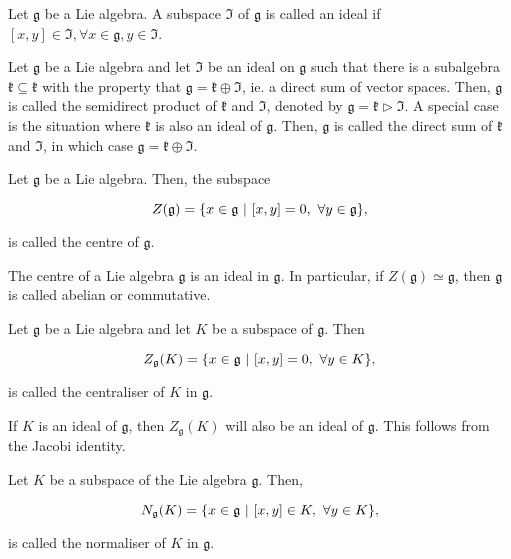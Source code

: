 \documentclass{homework}
\begin{document}
\begin{df}
Let $\mathfrak{g}$ be a Lie algebra. A subspace $\mathfrak{I}$ of $\mathfrak{g}$ is called an ideal if $[x,y] \in \mathfrak{I}, \forall x \in \mathfrak{g}, y \in \mathfrak{I}$. 
\end{df}

Let $\mathfrak{g}$ be a Lie algebra and let $\mathfrak{I}$ be an ideal on $\mathfrak{g}$ such that there is a subalgebra $\mathfrak{k} \subseteq \mathfrak{k}$ with the property that $\mathfrak{g} = \mathfrak{k} \oplus \mathfrak{I}$, ie. a direct sum of vector spaces. Then, $\mathfrak{g}$ is called the semidirect product of $\mathfrak{k}$ and $\mathfrak{I}$, denoted by $\mathfrak{g} =
\mathfrak{k} \triangleright \mathfrak{I}$. A special case is the situation where $\mathfrak{k}$ is also an ideal of $\mathfrak{g}$. Then, $\mathfrak{g}$ is called the direct sum of $\mathfrak{k}$ and $\mathfrak{I}$, in which case $\mathfrak{g} = \mathfrak{k} \oplus \mathfrak{I}.$ \\

\begin{df}
Let $\mathfrak{g}$ be a Lie algebra. Then, the subspace 

$$
    Z(\mathfrak{g}) = \{x \in \mathfrak{g} \textnormal{ } |\textnormal{ } [x,y] = 0, \textnormal{ } \forall y \in \mathfrak{g}\},
$$

is called the centre of $\mathfrak{g}$.
\end{df}

The centre of a Lie algebra $\mathfrak{g}$ is an ideal in $\mathfrak{g}$. In particular, if $Z(\mathfrak{g}) \simeq \mathfrak{g}$, then $\mathfrak{g}$ is called abelian or commutative. \\

\begin{df}
Let $\mathfrak{g}$ be a Lie algebra and let $K$ be a subspace of $\mathfrak{g}$. Then

$$
    Z_{\mathfrak{g}}(K) = \{x \in \mathfrak{g} \textnormal{ } | \textnormal{ } [x,y] = 0, \textnormal{ } \forall y \in K\},
$$

is called the centraliser of $K$ in $\mathfrak{g}$. \\
\end{df}

If $K$ is an ideal of $\mathfrak{g}$, then $Z_{\mathfrak{g}}(K)$ will also be an ideal of $\mathfrak{g}$. This follows from the Jacobi identity. \\

\begin{df}
Let $K$ be a subspace of the Lie algebra $\mathfrak{g}$. Then, 

$$
    N_{\mathfrak{g}}(K) = \{x \in \mathfrak{g} \textnormal{ } | \textnormal{ } [x,y] \in K, \textnormal{ } \forall y \in K\},
$$

is called the normaliser of $K$ in $\mathfrak{g}$.
\end{df}
\end{document}
